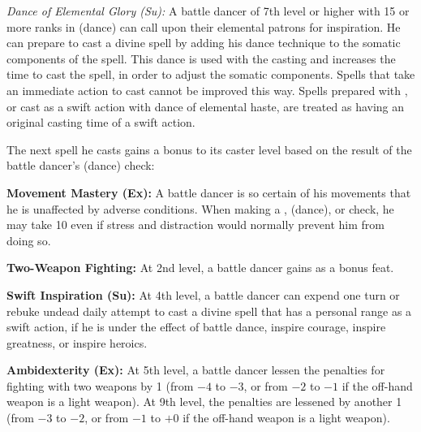 {\textit{Dance of Elemental Glory (Su):} A battle dancer of 7th level or higher with 15 or more ranks in  (dance) can call upon their elemental patrons for inspiration. He can prepare to cast a divine spell by adding his dance technique to the somatic components of the spell. This dance is used with the casting and increases the time to cast the spell, in order to adjust the somatic components. Spells that take an immediate action to cast cannot be improved this way. Spells prepared with , or cast as a swift action with dance of elemental haste, are treated as having an original casting time of a swift action.


The next spell he casts gains a bonus to its caster level based on the result of the battle dancer's  (dance) check:


\textbf{Movement Mastery (Ex):} A battle dancer is so certain of his movements that he is unaffected by adverse conditions. When making a ,  (dance), or  check, he may take 10 even if stress and distraction would normally prevent him from doing so.

\textbf{Two-Weapon Fighting:} At 2nd level, a battle dancer gains  as a bonus feat.

\textbf{Swift Inspiration (Su):} At 4th level, a battle dancer can expend one turn or rebuke undead daily attempt to cast a divine spell that has a personal range as a swift action, if he is under the effect of battle dance, inspire courage, inspire greatness, or inspire heroics.

\textbf{Ambidexterity (Ex):} At 5th level, a battle dancer lessen the penalties for fighting with two weapons by 1 (from $-4$ to $-3$, or from $-2$ to $-1$ if the off-hand weapon is a light weapon). At 9th level, the penalties are lessened by another 1 (from $-3$ to $-2$, or from $-1$ to $+0$ if the off-hand weapon is a light weapon).
}